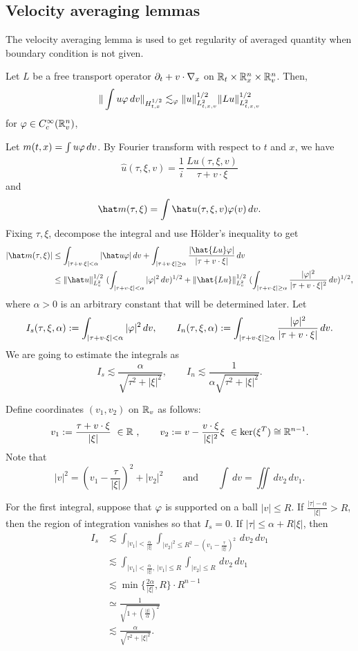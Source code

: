 \documentclass[a4paper]{article}
\begin{document}
\subsection{Velocity averaging lemmas}
The velocity averaging lemma is used to get regularity of averaged quantity when boundary condition is not given.
\begin{thm}
Let $L$ be a free transport operator $\pd_t+v\cdot\nabla_x$ on $\mathbb{R}_t\times\mathbb{R}_x^n\times\mathbb{R}_v^n$.
Then,
\[\|\int u\varphi\,dv\|_{H_{t,x}^{1/2}}\lesssim_\varphi\|u\|_{L_{t,x,v}^2}^{1/2}\|Lu\|_{L_{t,x,v}^2}^{1/2}\]
for $\varphi\in C_c^\infty(\mathbb{R}_v^n)$,
\end{thm}
\begin{pf}
Let $m(t,x)=\int u\varphi\,dv$.
By Fourier transform with respect to $t$ and $x$, we have
\[\hat u(\tau,\xi,v)=\frac1i\,\frac{\hat{Lu}(\tau,\xi,v)}{\tau+v\cdot\xi}\]
and
\[\hat m(\tau,\xi)=\int\hat u(\tau,\xi,v)\f(v)\,dv.\]
Fixing $\tau,\xi$, decompose the integral and use H\"older's inequality to get
\begin{align*}
|\hat m(\tau,\xi)|
&\le\int_{|\tau+v\cdot\xi|<\alpha}|\hat u\f|\,dv+\int_{|\tau+v\cdot\xi|\ge\alpha}\frac{|\hat{Lu}\f|}{|\tau+v\cdot\xi|}\,dv\\
&\le\|\hat u\|_{L_v^2}^{1/2}\ (\int_{|\tau+v\cdot\xi|<\alpha}|\f|^2\,dv)^{1/2}+\|\hat{Lu}\|_{L_v^2}^{1/2}\ (\int_{|\tau+v\cdot\xi|\ge\alpha}\frac{|\f|^2}{|\tau+v\cdot\xi|^2}\,dv)^{1/2},
\end{align*}
where $\alpha>0$ is an arbitrary constant that will be determined later.
Let
\[I_s(\tau,\xi,\alpha):=\int_{|\tau+v\cdot\xi|<\alpha}|\varphi|^2\,dv,\qquad
I_n(\tau,\xi,\alpha):=\int_{|\tau+v\cdot\xi|\ge\alpha}\frac{|\varphi|^2}{|\tau+v\cdot\xi|}\,dv.\]
We are going to estimate the integrals as
\[I_s\lesssim\frac{\alpha}{\sqrt{\tau^2+|\xi|^2}},\qquad
I_n\lesssim\frac1{\alpha\sqrt{\tau^2+|\xi|^2}}.\]

Define coordinates $(v_1,v_2)$ on $\mathbb{R}_v$ as follows:
\[v_1:=\frac{\tau+v\cdot\xi}{|\xi|}\ \in\R\ ,\qquad v_2:=v-\frac{v\cdot\xi}{|\xi|^2}\xi\ \in\ker(\xi^T)\cong\R^{n-1}.\]
Note that
\[|v|^2=(v_1-\frac\tau{|\xi|})^2+|v_2|^2\qquad\text{and}\qquad\int\,dv=\iint\,dv_2\,dv_1.\]

For the first integral, suppose that $\varphi$ is supported on a ball $|v|\le R$.
If $\frac{|\tau|-\alpha}{|\xi|}>R$, then the region of integration vanishes so that $I_s=0$.
If $|\tau|\le\alpha+R|\xi|$, then
\begin{align*}
I_s&\lesssim\int_{|v_1|<\frac\alpha{|\xi|}}\int_{|v_2|^2\le R^2-(v_1-\frac\tau{|\xi|})^2}\,dv_2\,dv_1\\
&\lesssim\int_{|v_1|<\frac\alpha{|\xi|},\ |v_1|\le R}\int_{|v_2|\le R}\,dv_2\,dv_1\\
&\lesssim\min\{\frac{2\alpha}{|\xi|},R\}\cdot R^{n-1}\\
&\simeq\frac1{\sqrt{1+(\frac{|\xi|}\alpha)^2}}\\
&\lesssim\frac\alpha{\sqrt{\tau^2+|\xi|^2}}.
\end{align*}


\end{pf}
\end{document}
